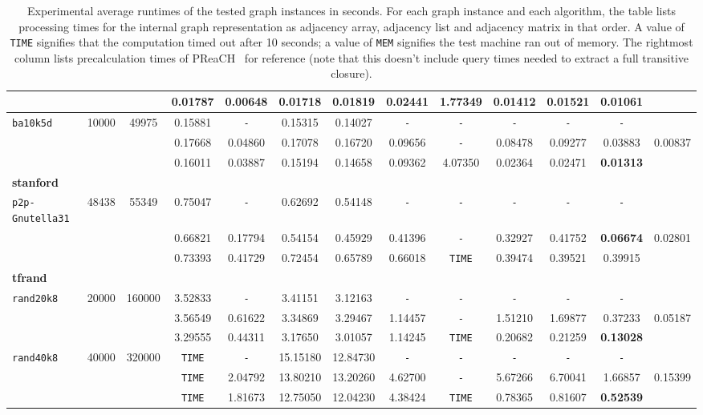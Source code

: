 \begin{table}
{\begin{tabular}{ l c c | c c c c c c c c c || c }
 &  &  & 0.01787 & \textbf{0.00648} & 0.01718 & 0.01819 & 0.02441 & 1.77349 & 0.01412 & 0.01521 & 0.01061 & \\
\hline
\verb|ba10k5d| & 10000 & 49975 & 0.15881 & \verb|-| & 0.15315 & 0.14027 & \verb|-| & \verb|-| & \verb|-| & \verb|-| & \verb|-| & \\
 &  &  & 0.17668 & 0.04860 & 0.17078 & 0.16720 & 0.09656 & \verb|-| & 0.08478 & 0.09277 & 0.03883 & 0.00837 \\
 &  &  & 0.16011 & 0.03887 & 0.15194 & 0.14658 & 0.09362 & 4.07350 & 0.02364 & 0.02471 & \textbf{0.01313} & \\
\hline
\multicolumn{13}{l}{\textbf{stanford}} \\
\hline
\verb|p2p-Gnutella31| & 48438 & 55349 & 0.75047 & \verb|-| & 0.62692 & 0.54148 & \verb|-| & \verb|-| & \verb|-| & \verb|-| & \verb|-| & \\
 &  &  & 0.66821 & 0.17794 & 0.54154 & 0.45929 & 0.41396 & \verb|-| & 0.32927 & 0.41752 & \textbf{0.06674} & 0.02801 \\
 &  &  & 0.73393 & 0.41729 & 0.72454 & 0.65789 & 0.66018 & \verb|TIME| & 0.39474 & 0.39521 & 0.39915 & \\
\hline
\multicolumn{13}{l}{\textbf{tfrand}} \\
\hline
\verb|rand20k8| & 20000 & 160000 & 3.52833 & \verb|-| & 3.41151 & 3.12163 & \verb|-| & \verb|-| & \verb|-| & \verb|-| & \verb|-| & \\
 &  &  & 3.56549 & 0.61622 & 3.34869 & 3.29467 & 1.14457 & \verb|-| & 1.51210 & 1.69877 & 0.37233 & 0.05187 \\
 &  &  & 3.29555 & 0.44311 & 3.17650 & 3.01057 & 1.14245 & \verb|TIME| & 0.20682 & 0.21259 & \textbf{0.13028} & \\
\hline
\verb|rand40k8| & 40000 & 320000 & \verb|TIME| & \verb|-| & 15.15180 & 12.84730 & \verb|-| & \verb|-| & \verb|-| & \verb|-| & \verb|-| & \\
 &  &  & \verb|TIME| & 2.04792 & 13.80210 & 13.20260 & 4.62700 & \verb|-| & 5.67266 & 6.70041 & 1.66857 & 0.15399 \\
 &  &  & \verb|TIME| & 1.81673 & 12.75050 & 12.04230 & 4.38424 & \verb|TIME| & 0.78365 & 0.81607 & \textbf{0.52539} & \\
\hline
  \end{tabular}
}
\caption{Experimental average runtimes of the tested graph instances in seconds. For each graph instance and each algorithm, the table lists processing times for the internal graph representation as adjacency array, adjacency list and adjacency matrix in that order. A value of \texttt{TIME} signifies that the computation timed out after 10 seconds; a value of \texttt{MEM} signifies the test machine ran out of memory. The rightmost column lists precalculation times of PReaCH~\cite{preach} for reference (note that this doesn't include query times needed to extract a full transitive closure).}
\label{results}
\end{table}

